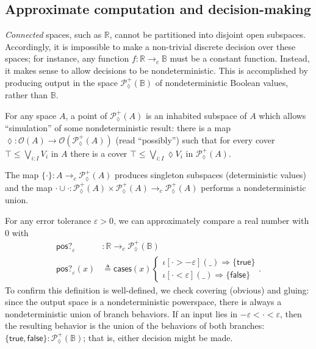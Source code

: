 \documentclass[conference]{IEEEtran}
\newcommand{\PLower}{\mathcal{P}_\lozenge}
\newcommand{\cto}{\to_c}
\newcommand{\R}{\mathbb{R}}
\newcommand{\Open}[1]{\mathcal{O}({#1})}
\newcommand{\bool}{\mathbb{B}}
\newcommand{\wildcard}{\_}
\newcommand{\oinclf}[1]{\iota[{#1}]}
\newcommand{\oincl}[2]{\oinclf{#1} \left({#2}\right)}
\newcommand{\Branch}{\Rightarrow}
\begin{document}
\subsection{Approximate computation and decision-making}
\label{s:ex:approx}

\emph{Connected} spaces, such as $\R$, cannot be partitioned into disjoint open subspaces. Accordingly, it is impossible to make a non-trivial discrete decision over these spaces; for instance, any function $f : \R \cto \bool$ must be a constant function. Instead, it makes sense to allow decisions to be nondeterministic. This is accomplished by producing output in the space $\PLower^+(\bool)$ of nondeterministic Boolean values, rather than $\bool$.

For any space $A$, a point of $\PLower^+(A)$ is an inhabited subspace of $A$ which allows ``simulation'' of some nondeterministic result: there is a map $\lozenge : \Open{A} \to \Open{\PLower^+(A)}$ (read ``possibly'') such that for every cover $\top \le \bigvee_{i : I} V_i$ in $A$ there is a cover $\top \le \bigvee_{i : I} \lozenge V_i$ in $\PLower^+(A)$. 

The map $\{ \cdot \} : A \cto \PLower^+(A)$ produces singleton subspaces (deterministic values) and the map $\cdot \cup \cdot : \PLower^+(A) \times \PLower^+(A) \cto \PLower^+(A)$ performs a nondeterministic union.

For any error tolerance $\varepsilon > 0$, we can approximately compare a real number with 0 with
\begin{align*}
\mathsf{pos?}_\varepsilon &: \R \cto \PLower^+(\bool)
\\ \mathsf{pos?}_\varepsilon(x) &\triangleq \mathsf{cases}(x)
\begin{cases}
\oincl{\cdot > - \varepsilon}{\wildcard} \Branch \{ \mathsf{true} \}
\\ \oincl{\cdot < \varepsilon}{\wildcard} \Branch \{ \mathsf{false} \}
\end{cases}.
\end{align*}
To confirm this definition is well-defined, we check covering (obvious) and gluing: since the output space is a nondeterministic powerspace, there is always a nondeterministic union of branch behaviors. If an input lies in $- \varepsilon < \cdot < \varepsilon$, then the resulting behavior is the union of the behaviors of both branches: $\{ \mathsf{true}, \mathsf{false} \} : \PLower^+(\bool)$; that is, either decision might be made.
\end{document}
